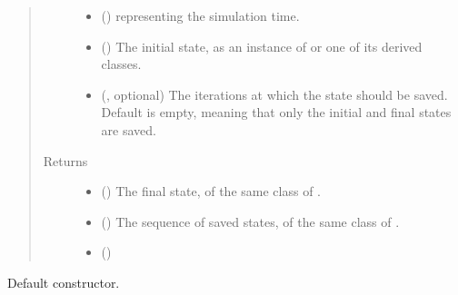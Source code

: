 \documentclass[letterpaper,10pt,english]{sphinxmanual}
\begin{document}
\begin{fulllineitems}
\begin{fulllineitems}
\begin{quote}
\begin{description}
\begin{itemize}
\item {} 
 () \textendash{}  representing the simulation time.

\item {} 
 () \textendash{} The initial state, as an instance of {\hyperref[\detokenize{api:tasmania.storages.grid_data.GridData}]{}} or one of its derived classes.

\item {} 
 (, optional) \textendash{} The iterations at which the state should be saved. Default is empty, meaning that only the initial and
final states are saved.

\end{itemize}

\item[{Returns}] \leavevmode
\begin{itemize}
\item {} 
 () \textendash{} The final state, of the same class of .

\item {} 
 () \textendash{} The sequence of saved states, of the same class of .

\item {} 
 ()

\end{itemize}


\end{description}\end{quote}

\end{fulllineitems}


\begin{fulllineitems}
\label{\detokenize{api:tasmania.model.Model.__init__}}
Default constructor.

\end{fulllineitems}



\end{fulllineitems}
\end{document}
